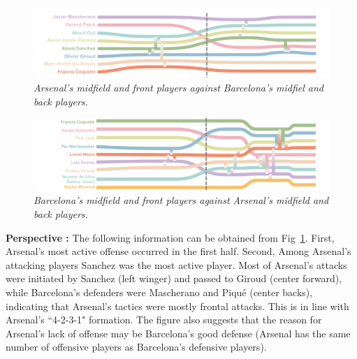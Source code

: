 \documentclass[review,journal]{vgtc}         %
\begin{document}
\begin{figure}[t]
	\centering
	\includegraphics[width=\textwidth]{Fig/A2B.pdf}
		\vspace{-1.5em}
	\caption{ \textit{Arsenal’s midfield and front players against Barcelona’s midfiel and back players.} }
		\vspace{0em}
	\label{fig:fba2b}
\end{figure}

\begin{figure}[t]
	\centering
	\includegraphics[width=\textwidth]{Fig/B2A.pdf}
		\vspace{-1em}
	\caption{ \textit{Barcelona’s midfield and front players against Arsenal’s midfield and back players.} }
		\vspace{-1em}
	\label{fig:fbb2a}
\end{figure}


\textbf{Perspective :} The following information can be obtained from Fig~\ref{fig:fba2b}. First, Arsenal's most active offense occurred in the first half. Second, Among Arsenal's attacking players Sanchez was the most active player. Most of Arsenal's attacks were initiated by Sanchez (left winger) and passed to Giroud (center forward), while Barcelona's defenders were Mascherano and Piqué (center backs), indicating that Arsenal's tactics were mostly frontal attacks. This is in line with Arsenal's ``4-2-3-1" formation. The figure also suggests that the reason for Arsenal's lack of offense may be Barcelona's good defense (Arsenal has the same number of offensive players as Barcelona's defensive players).
\end{document}

